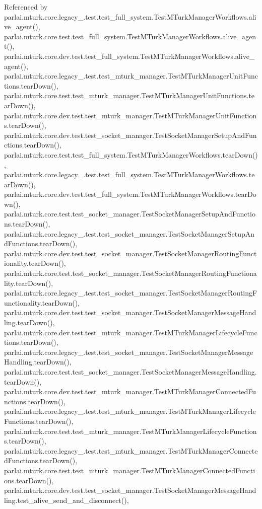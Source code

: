 Referenced by parlai.\+mturk.\+core.\+legacy\+\_.\+test.\+test\+\_\+full\+\_\+system.\+Test\+M\+Turk\+Manager\+Workflows.\+alive\+\_\+agent(), parlai.\+mturk.\+core.\+test.\+test\+\_\+full\+\_\+system.\+Test\+M\+Turk\+Manager\+Workflows.\+alive\+\_\+agent(), parlai.\+mturk.\+core.\+dev.\+test.\+test\+\_\+full\+\_\+system.\+Test\+M\+Turk\+Manager\+Workflows.\+alive\+\_\+agent(), parlai.\+mturk.\+core.\+legacy\+\_.\+test.\+test\+\_\+mturk\+\_\+manager.\+Test\+M\+Turk\+Manager\+Unit\+Functions.\+tear\+Down(), parlai.\+mturk.\+core.\+test.\+test\+\_\+mturk\+\_\+manager.\+Test\+M\+Turk\+Manager\+Unit\+Functions.\+tear\+Down(), parlai.\+mturk.\+core.\+dev.\+test.\+test\+\_\+mturk\+\_\+manager.\+Test\+M\+Turk\+Manager\+Unit\+Functions.\+tear\+Down(), parlai.\+mturk.\+core.\+dev.\+test.\+test\+\_\+socket\+\_\+manager.\+Test\+Socket\+Manager\+Setup\+And\+Functions.\+tear\+Down(), parlai.\+mturk.\+core.\+test.\+test\+\_\+full\+\_\+system.\+Test\+M\+Turk\+Manager\+Workflows.\+tear\+Down(), parlai.\+mturk.\+core.\+legacy\+\_.\+test.\+test\+\_\+full\+\_\+system.\+Test\+M\+Turk\+Manager\+Workflows.\+tear\+Down(), parlai.\+mturk.\+core.\+dev.\+test.\+test\+\_\+full\+\_\+system.\+Test\+M\+Turk\+Manager\+Workflows.\+tear\+Down(), parlai.\+mturk.\+core.\+test.\+test\+\_\+socket\+\_\+manager.\+Test\+Socket\+Manager\+Setup\+And\+Functions.\+tear\+Down(), parlai.\+mturk.\+core.\+legacy\+\_.\+test.\+test\+\_\+socket\+\_\+manager.\+Test\+Socket\+Manager\+Setup\+And\+Functions.\+tear\+Down(), parlai.\+mturk.\+core.\+dev.\+test.\+test\+\_\+socket\+\_\+manager.\+Test\+Socket\+Manager\+Routing\+Functionality.\+tear\+Down(), parlai.\+mturk.\+core.\+test.\+test\+\_\+socket\+\_\+manager.\+Test\+Socket\+Manager\+Routing\+Functionality.\+tear\+Down(), parlai.\+mturk.\+core.\+legacy\+\_.\+test.\+test\+\_\+socket\+\_\+manager.\+Test\+Socket\+Manager\+Routing\+Functionality.\+tear\+Down(), parlai.\+mturk.\+core.\+dev.\+test.\+test\+\_\+socket\+\_\+manager.\+Test\+Socket\+Manager\+Message\+Handling.\+tear\+Down(), parlai.\+mturk.\+core.\+dev.\+test.\+test\+\_\+mturk\+\_\+manager.\+Test\+M\+Turk\+Manager\+Lifecycle\+Functions.\+tear\+Down(), parlai.\+mturk.\+core.\+legacy\+\_.\+test.\+test\+\_\+socket\+\_\+manager.\+Test\+Socket\+Manager\+Message\+Handling.\+tear\+Down(), parlai.\+mturk.\+core.\+test.\+test\+\_\+socket\+\_\+manager.\+Test\+Socket\+Manager\+Message\+Handling.\+tear\+Down(), parlai.\+mturk.\+core.\+dev.\+test.\+test\+\_\+mturk\+\_\+manager.\+Test\+M\+Turk\+Manager\+Connected\+Functions.\+tear\+Down(), parlai.\+mturk.\+core.\+legacy\+\_.\+test.\+test\+\_\+mturk\+\_\+manager.\+Test\+M\+Turk\+Manager\+Lifecycle\+Functions.\+tear\+Down(), parlai.\+mturk.\+core.\+test.\+test\+\_\+mturk\+\_\+manager.\+Test\+M\+Turk\+Manager\+Lifecycle\+Functions.\+tear\+Down(), parlai.\+mturk.\+core.\+legacy\+\_.\+test.\+test\+\_\+mturk\+\_\+manager.\+Test\+M\+Turk\+Manager\+Connected\+Functions.\+tear\+Down(), parlai.\+mturk.\+core.\+test.\+test\+\_\+mturk\+\_\+manager.\+Test\+M\+Turk\+Manager\+Connected\+Functions.\+tear\+Down(), parlai.\+mturk.\+core.\+dev.\+test.\+test\+\_\+socket\+\_\+manager.\+Test\+Socket\+Manager\+Message\+Handling.\+test\+\_\+alive\+\_\+send\+\_\+and\+\_\+disconnect(), 